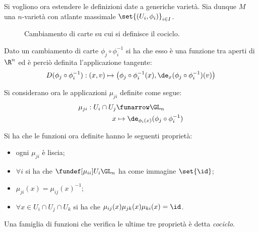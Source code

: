 Si vogliono ora estendere le definizioni date a generiche varietà.
Sia dunque $M$ una $n$-varietà con atlante massimale $\set{(U_i, \phi _i)}_{i\in I}$.

\begin{figure}
\centering

\caption{Cambiamento di carte su cui si definisce il cociclo.}
\end{figure}

\begin{oss}
Dato un cambiamento di carte $\phi _j \circ \phi _i ^{-1}$ si ha che esso è una funzione tra aperti di $\R ^n$ ed è perciò definita l'applicazione tangente:
\begin{equation*}
D(\phi _j \circ \phi _i ^{-1}): (x,v) \mapsto \big(\phi _j \circ \phi _i ^{-1}(x), \de_x(\phi _j \circ \phi _i ^{-1})(v)\big)
\end{equation*}
\end{oss}

Si considerano ora le applicazioni $\mu_{ji}$ definite come segue:
\begin{align*}
\mu_{ji} : U_i\cap U_j &\funarrow \GL_n \\
x &\mapsto \de_{\phi_i(x)} (\phi _j \circ \phi _i ^{-1})
\end{align*}

\begin{oss}
Si ha che le funzioni ora definite hanno le seguenti proprietà:
\begin{itemize}
\item ogni $\mu_{ji}$ è liscia;
\item $\forall i$ si ha che $\fundef[\mu_{ii}]{U_i}{\GL_n}$ ha come immagine $\set{\id}$;
\item $\mu_{ji}(x) = \mu_{ij}(x)^{-1}$;
\item $\forall x \in U_i\cap U_j\cap U_k$ si ha che $\mu_{ij}(x)\mu_{jk}(x)\mu_{ki}(x) = \id$.
\end{itemize}
Una famiglia di funzioni che verifica le ultime tre proprietà è detta \emph{cociclo}.
\end{oss}


\begin{epigraphs}	
\end{epigraphs}
